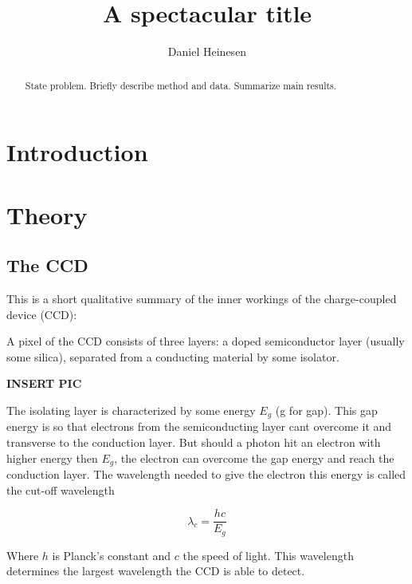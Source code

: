 \documentclass{emulateapj}
\begin{document}
\title{A spectacular title}

\author{Daniel Heinesen}





\begin{abstract}
  State problem. Briefly describe method and data. Summarize main results.
\end{abstract}

\section{Introduction}
\label{sec:introduction}

\section{Theory}
\label{sec:theory}
\subsection{The CCD}
\label{sec:ccd}
This is a short qualitative summary of the inner workings of the charge-coupled device (CCD):

A pixel of the CCD consists of three layers: a doped semiconductor layer (usually some silica), separated from a conducting material by some isolator. 

\textbf{INSERT PIC}


The isolating layer is characterized by some energy $E_g$ (g for gap). This gap energy is so that electrons from the semiconducting layer cant overcome it and transverse to the conduction layer. But should a photon hit an electron with higher energy then $E_g$, the electron can overcome the gap energy and reach the conduction layer. The wavelength needed to give the electron this energy is called the cut-off wavelength

\begin{equation}
\lambda_{c} = \frac{hc}{E_g}
\end{equation}

Where $h$ is Planck's constant and $c$ the speed of light. This wavelength determines the largest wavelength the CCD is able to detect. 
\end{document}
